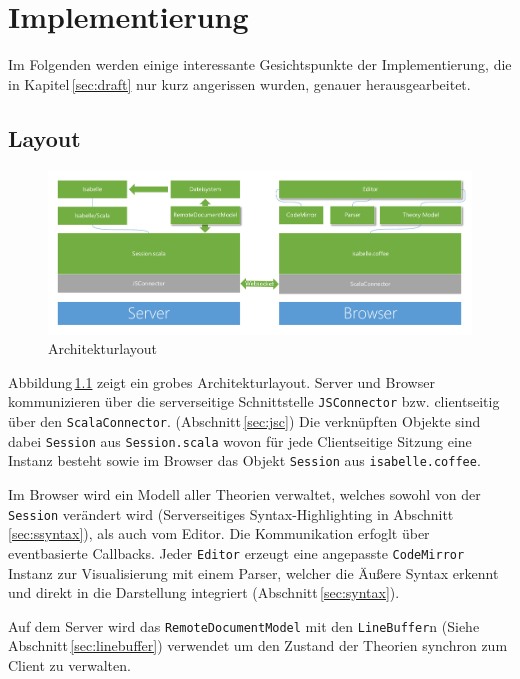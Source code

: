 \chapter{Implementierung}
\label{sec:imp}

Im Folgenden werden einige interessante Gesichtspunkte der Implementierung, die in
Kapitel\,\ref{sec:draft} nur kurz angerissen wurden, genauer herausgearbeitet.

\section{Layout}
\label{sec:layout}

\begin{figure}[ht]
\includegraphics[width=\linewidth]{images/layout}
  \caption{Architekturlayout}
  \label{fig:layout}
\end{figure}

Abbildung\,\ref{fig:layout} zeigt ein grobes Architekturlayout. Server und Browser kommunizieren
über die serverseitige Schnittstelle \texttt{JSConnector} bzw. clientseitig über den
\texttt{ScalaConnector}. (Abschnitt\,\ref{sec:jsc}) Die verknüpften Objekte sind dabei
\texttt{Session} aus \texttt{Session.scala} wovon für jede Clientseitige Sitzung eine Instanz besteht
sowie im Browser das Objekt \texttt{Session} aus \texttt{isabelle.coffee}.

Im Browser wird ein Modell aller Theorien verwaltet, welches sowohl von der \texttt{Session}
verändert wird (Serverseitiges Syntax-Highlighting in Abschnitt\,\ref{sec:ssyntax}), als auch vom
Editor. Die Kommunikation erfoglt über eventbasierte Callbacks. Jeder \texttt{Editor} erzeugt eine
angepasste \texttt{CodeMirror} Instanz zur Visualisierung mit einem Parser, welcher die Äußere
Syntax erkennt und direkt in die Darstellung integriert (Abschnitt\,\ref{sec:syntax}).

Auf dem Server wird das \texttt{RemoteDocumentModel} mit den \texttt{LineBuffer}n (Siehe
Abschnitt\,\ref{sec:linebuffer}) verwendet um den Zustand der Theorien synchron zum Client zu
verwalten.


